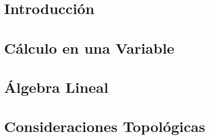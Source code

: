 \documentclass{book}
\begin{document}
\theoremstyle{plain}
\newtheorem{theorem}{Teorema}[chapter]
\theoremstyle{definition}
\newtheorem{definition}[theorem]{Definición}[chapter]
\theoremstyle{plain}
\newtheorem{proposition}[theorem]{Proposición}[chapter]
\theoremstyle{plain}
\newtheorem{corollary}[theorem]{Corolario}[chapter]
\theoremstyle{definition}
\newtheorem{example}[theorem]{Ejemplo}[chapter]
\theoremstyle{plain}
\newtheorem{lemma}[theorem]{Lema}[chapter]
\theoremstyle{remark}
\newtheorem*{remark}{Nota}
\theoremstyle{remark}
\newtheorem*{question}{Pregunta}

\renewcommand\qedsymbol{$\blacksquare$}


\tableofcontents

\chapter{Introducción}


\chapter{Cálculo en una Variable}


\chapter{Álgebra Lineal}


\printbibliography[heading=bibintoc]

\appendix

\chapter{Consideraciones Topológicas}

\end{document}
